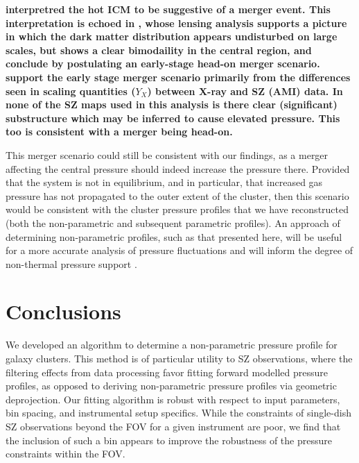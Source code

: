 \documentclass[twocolumn,traditabstract]{aa}
\begin{document}
\textbf{\citet{maughan2007} interpretred the hot ICM to be suggestive of a merger event. This interpretation is echoed in \citet{jee2009a}, whose lensing analysis supports a picture in which the dark matter distribution appears undisturbed on large scales, but shows a clear bimodaility in the central region, and conclude by postulating an early-stage head-on merger scenario. \citet{rumsey2016} support the early stage merger scenario primarily from the differences seen in scaling quantities ($Y_X$) between X-ray and SZ (AMI) data. In none of the SZ maps used in this analysis is there clear (significant) substructure which may be inferred to cause elevated pressure. This too is consistent with a merger being head-on.} 

This merger scenario could still be consistent with our findings, as a merger affecting the central pressure should indeed
increase the pressure there. Provided that the system is not in equilibrium, and in particular, that increased gas pressure
has not propagated to the outer extent of the cluster, then this scenario would be consistent with the cluster pressure profiles
that we have reconstructed (both the non-parametric and subsequent parametric profiles). An approach of determining non-parametric
profiles, such as that presented here, will be useful for a more accurate analysis of pressure fluctuations and will inform
the degree of non-thermal pressure support \citep[e.g.][]{khatri2016}.



\section{Conclusions}
\label{sec:conclusions}

We developed an algorithm to determine a non-parametric pressure profile for galaxy clusters.
This method is of particular utility to SZ observations, where the filtering effects from data
processing favor fitting forward modelled pressure profiles, as opposed to deriving non-parametric pressure profiles via
geometric deprojection. Our fitting algorithm is robust with respect to input parameters,
bin spacing, and instrumental setup specifics. While the constraints of single-dish SZ observations
beyond the FOV for a given instrument are poor, we find that the inclusion of such a bin
appears to improve the robustness of the pressure constraints within the FOV.
\end{document}
